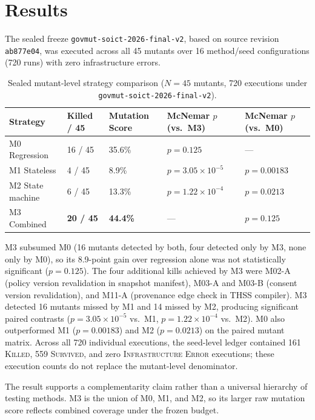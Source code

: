 \documentclass[conference]{IEEEtran}
\begin{document}
\section{Results}
The sealed freeze \texttt{govmut-soict-2026-final-v2}, based on source revision \texttt{ab877e04}, was executed across all 45 mutants over 16 method/seed configurations (720 runs) with zero infrastructure errors.

\begin{table}[t]
\caption{Sealed mutant-level strategy comparison ($N=45$ mutants, 720 executions under \texttt{govmut-soict-2026-final-v2}).}
\label{tab:res}
\centering\scriptsize
\setlength{\tabcolsep}{2.5pt}
\begin{tabular}{p{}p{}p{}p{}p{}}
\toprule
Strategy & Killed / 45 & Mutation Score & McNemar $p$ (vs.\ M3) & McNemar $p$ (vs.\ M0) \\
\midrule
M0 Regression & 16 / 45 & 35.6\% & $p = 0.125$ & --- \\
M1 Stateless & 4 / 45 & 8.9\% & $p = 3.05 \times 10^{-5}$ & $p = 0.00183$ \\
M2 State machine & 6 / 45 & 13.3\% & $p = 1.22 \times 10^{-4}$ & $p = 0.0213$ \\
M3 Combined & \textbf{20 / 45} & \textbf{44.4\%} & --- & $p = 0.125$ \\
\bottomrule
\end{tabular}
\end{table}

M3 subsumed M0 (16 mutants detected by both, four detected only by M3, none only by M0), so its 8.9-point gain over regression alone was not statistically significant ($p = 0.125$). The four additional kills achieved by M3 were M02-A (policy version revalidation in snapshot manifest), M03-A and M03-B (consent version revalidation), and M11-A (provenance edge check in THSS compiler). M3 detected 16 mutants missed by M1 and 14 missed by M2, producing significant paired contrasts ($p = 3.05 \times 10^{-5}$ vs.\ M1, $p = 1.22 \times 10^{-4}$ vs.\ M2). M0 also outperformed M1 ($p=0.00183$) and M2 ($p=0.0213$) on the paired mutant matrix. Across all 720 individual executions, the seed-level ledger contained 161 \textsc{Killed}, 559 \textsc{Survived}, and zero \textsc{Infrastructure Error} executions; these execution counts do not replace the mutant-level denominator.

The result supports a complementarity claim rather than a universal hierarchy of testing methods. M3 is the union of M0, M1, and M2, so its larger raw mutation score reflects combined coverage under the frozen budget.
\end{document}

